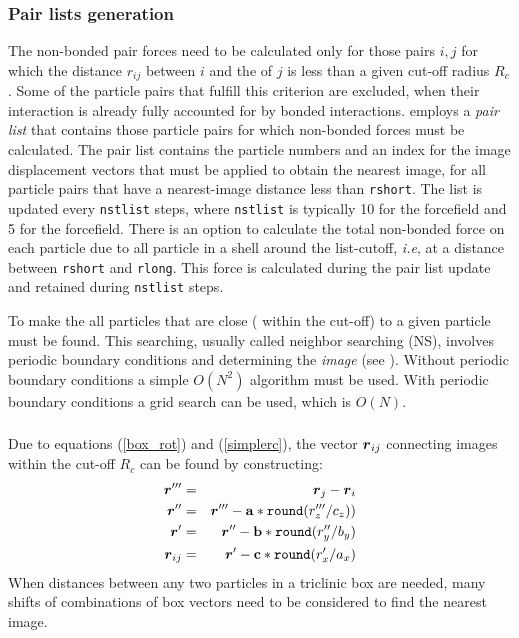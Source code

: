\subsubsection{Pair lists generation}
The non-bonded pair forces need to be calculated only for those pairs
$i,j$  for which the distance $r_{ij}$ between $i$ and the 
of  $j$ is less than a given cut-off radius $R_c$. Some of the
particle pairs that fulfill this criterion are excluded, when their
interaction is already fully accounted for by bonded interactions.
{\gromacs} employs  a {\em pair list} that contains 
those  particle pairs for which non-bonded forces must be calculated.
The  pair list contains the particle numbers and an index for the image
displacement vectors that must be applied to  obtain the nearest
image, for  all particle pairs that
have a  nearest-image distance less than \verb'rshort'. The list is
updated  every \verb'nstlist' steps, where \verb'nstlist' is typically
10 for the {\gromacs} forcefield and 5 for the  forcefield.
There is an option to calculate the total non-bonded force
on each  particle due to all particle in a shell around the
list-cutoff, {\em  i.e}, at a distance between \verb'rshort' and
\verb'rlong'.  This force is calculated during the pair list update
and  retained during \verb'nstlist' steps.

To make the  all particles that are close
({\ie} within the cut-off) to a given particle must be found.
This searching, usually called neighbor searching (NS),
involves periodic boundary conditions and determining the {\em image}
(see ). Without periodic boundary conditions a simple
$O(N^2)$ algorithm must be used. With periodic boundary conditions
a grid search can be used, which is $O(N)$.

\subsubsection{}
Due to equations (\ref{box_rot}) and (\ref{simplerc}), the vector $\mbox{\boldmath ${r}$}_{ij}$
connecting images within the cut-off $R_c$ can be found by constructing:
\begin{eqnarray}
\ve{r}'''   & = & \ve{r}_j-\ve{r}_i \\
\ve{r}''    & = & \ve{r}''' - {\bf a}*\verb'round'(r'''_z/c_z)) \\
\ve{r}'     & = & \ve{r}'' - {\bf b}*\verb'round'(r''_y/b_y) \\
\ve{r}_{ij} & = & \ve{r}' - {\bf c}*\verb'round'(r'_x/a_x)
\end{eqnarray}
When distances between any two particles in a triclinic box are needed,
many shifts of combinations of box vectors need to be considered to find
the nearest image.

